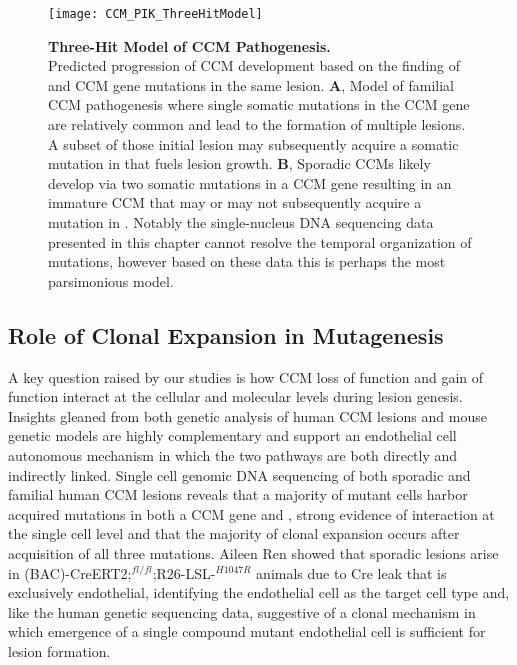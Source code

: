 \begin{figure}[tbp!]
\begin{center}
\texttt{[image: CCM\_PIK\_ThreeHitModel]}
\end{center}
\caption[Three-Hit Model of CCM Pathogenesis.] {\textbf{Three-Hit Model of CCM Pathogenesis.} \\ Predicted progression of CCM development based on the finding of  and CCM gene mutations in the same lesion. \textbf{A}, Model of familial CCM pathogenesis where single somatic mutations in the CCM gene are relatively common and lead to the formation of multiple lesions. A subset of those initial lesion may subsequently acquire a somatic mutation in  that fuels lesion growth. \textbf{B}, Sporadic CCMs likely develop via two somatic mutations in a CCM gene resulting in an immature CCM that may or may not subsequently acquire a mutation in . Notably the single-nucleus DNA sequencing data presented in this chapter cannot resolve the temporal organization of mutations, however based on these data this is perhaps the most parsimonious model. }

\label{CCM_PIK_ThreeHitModel}
\end{figure}

\subsection{Role of Clonal Expansion in Mutagenesis}
A key question raised by our studies is how CCM loss of function and  gain of function interact at the cellular and molecular levels during lesion genesis. Insights gleaned from both genetic analysis of human CCM lesions and mouse genetic models are highly complementary and support an endothelial cell autonomous mechanism in which the two pathways are both directly and indirectly linked. Single cell genomic DNA sequencing of both sporadic and familial human CCM lesions reveals that a majority of mutant cells harbor acquired mutations in both a CCM gene and , strong evidence of interaction at the single cell level and that the majority of clonal expansion occurs after acquisition of all three mutations. Aileen Ren showed that sporadic lesions arise in (BAC)-CreERT2;$^{fl/fl}$;R26-LSL-$^{H1047R}$ animals due to Cre leak that is exclusively endothelial, identifying the endothelial cell as the target cell type and, like the human genetic sequencing data, suggestive of a clonal mechanism in which emergence of a single compound mutant endothelial cell is sufficient for lesion formation.


